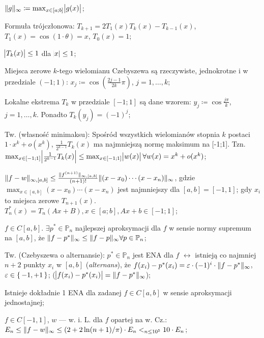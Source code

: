 
\entry
$\|g\|_\infty \coloneqq \max_{x \in [a;b]} \abs{g(x)}$;

\entry
Formuła trójczłonowa:
$T_{k + 1} = 2T_1(x)T_k(x) - T_{k-1}(x)$,
$T_1(x) = \cos(1 \cdot \theta)=x$,
$T_0(x) = 1$;

\entry
$\abs{T_k(x)} \leq 1$
dla
$\abs{x} \leq 1$;

\entry
Miejsca zerowe $k$-tego wielomianu Czebyszewa są rzeczywiste, jednokrotne i w przedziale $(-1;1)$:
$x_j \coloneqq \cos(\frac{2j-1}{2k}\pi)$, 
$j=1,\ldots,k$;

\entry
Lokalne ekstrema $T_k$ w przedziale $[-1;1]$ są dane wzorem:
$y_j \coloneqq \cos \frac{j\pi}{k}$,
$j=1,\ldots,k$.
Ponadto
$T_k(y_j) = (-1)^j$;

\entry
Tw. (własność minimaksu):
Spośród wszystkich wielomianów stopnia $k$ postaci
$1 \cdot x^k + o(x^k)$,
$\frac{1}{2^{k-1}} T_k(x)$
ma najmniejszą normę maksimum na [-1;1].
Tzn.
$\max_{x \in [-1;1]} \abs{\frac{1}{2^{k-1}} T_k(x)} \leq 
\max_{x \in [-1;1]} \abs{w(x)} 
\forall w(x) = x^k + o(x^k)$;

\entry
$\|f-w\|_{\infty, [a,b]} \leq 
\frac{\|f^{(n+1)}\|_{\infty, [a,b]}}{(n+1)!} 
\|(x-x_0) \cdots (x - x_n)\|_\infty$, 
gdzie
$\max_{x\in[a,b]} (x-x_0)\cdots(x-x_n)$
jest najmniejszy dla 
$[a,b] = [-1,1]$;
gdy $x_i$ to miejsca zerowe $T_{n + 1}(x)$.
\entry
$T^{*}_n(x) = T_n(Ax+B), x \in [a;b], Ax+b \in [-1;1]$;

\entry
$f \in C[a,b]$.
$\exists p^{*} \in \mathbb{P}_n$ 
najlepszej aproksymacji dla $f$ w sensie normy supremum na $[a,b]$, że
$\|f - p^{*}\|_\infty \leq \|f - p\|_\infty \forall p\in \mathbb{P}_n$;

\entry
Tw. (Czebyszewa o alternansie):
$p^{*} \in \mathbb{P}_n$
jest ENA dla $f$
$\leftrightarrow$
istnieją co najmniej $n+2$ punkty $x_i$ w $[a,b]$ (\textit{alternans}), że
$f(x_i) - p^{*}(x_i) = \varepsilon \cdot (-1)^i \cdot \|f - p^{*}\|_\infty$,
$\varepsilon \in \set{-1,+1}$;
($\abs{f(x_i) - p^{*}(x_i)} = \|f - p^{*}\|_\infty$);

\entry
Istnieje dokładnie 1 ENA dla zadanej 
$f\in C[a,b]$ 
w sensie aproksymacji jednostajnej;


\entry
$f \in C[-1,1]$,
$w$ --- w. i. L. dla $f$ opartej na w. Cz.:
$E_n \leq
\|f - w\|_\infty \leq
(2 + 2 \ln(n + 1) / \pi)\cdot E_n <_{n \leq 10^5}
10\cdot E_n$;
